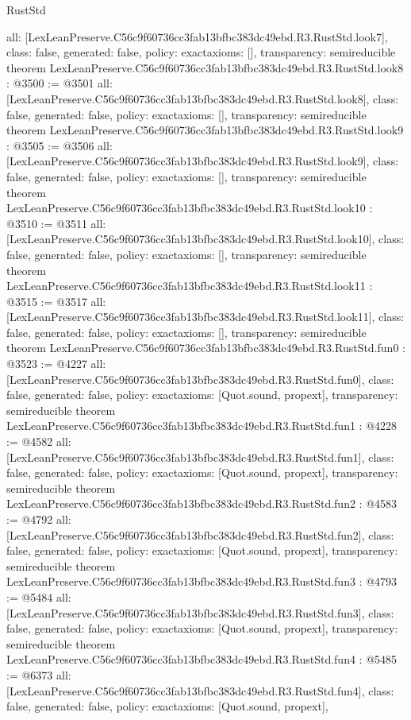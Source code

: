 \begin{lexlean}{RustStd}
\begin{coremodule}
{  all: [LexLeanPreserve.C56c9f60736cc3fab13bfbc383dc49ebd.R3.RustStd.look7],
  class: false,
  generated: false,
  policy: exact{axioms: []},
  transparency: semireducible
}
theorem LexLeanPreserve.C56c9f60736cc3fab13bfbc383dc49ebd.R3.RustStd.look8 : @3500 := @3501 {
  all: [LexLeanPreserve.C56c9f60736cc3fab13bfbc383dc49ebd.R3.RustStd.look8],
  class: false,
  generated: false,
  policy: exact{axioms: []},
  transparency: semireducible
}
theorem LexLeanPreserve.C56c9f60736cc3fab13bfbc383dc49ebd.R3.RustStd.look9 : @3505 := @3506 {
  all: [LexLeanPreserve.C56c9f60736cc3fab13bfbc383dc49ebd.R3.RustStd.look9],
  class: false,
  generated: false,
  policy: exact{axioms: []},
  transparency: semireducible
}
theorem LexLeanPreserve.C56c9f60736cc3fab13bfbc383dc49ebd.R3.RustStd.look10 : @3510 := @3511 {
  all: [LexLeanPreserve.C56c9f60736cc3fab13bfbc383dc49ebd.R3.RustStd.look10],
  class: false,
  generated: false,
  policy: exact{axioms: []},
  transparency: semireducible
}
theorem LexLeanPreserve.C56c9f60736cc3fab13bfbc383dc49ebd.R3.RustStd.look11 : @3515 := @3517 {
  all: [LexLeanPreserve.C56c9f60736cc3fab13bfbc383dc49ebd.R3.RustStd.look11],
  class: false,
  generated: false,
  policy: exact{axioms: []},
  transparency: semireducible
}
theorem LexLeanPreserve.C56c9f60736cc3fab13bfbc383dc49ebd.R3.RustStd.fun0 : @3523 := @4227 {
  all: [LexLeanPreserve.C56c9f60736cc3fab13bfbc383dc49ebd.R3.RustStd.fun0],
  class: false,
  generated: false,
  policy: exact{axioms: [Quot.sound, propext]},
  transparency: semireducible
}
theorem LexLeanPreserve.C56c9f60736cc3fab13bfbc383dc49ebd.R3.RustStd.fun1 : @4228 := @4582 {
  all: [LexLeanPreserve.C56c9f60736cc3fab13bfbc383dc49ebd.R3.RustStd.fun1],
  class: false,
  generated: false,
  policy: exact{axioms: [Quot.sound, propext]},
  transparency: semireducible
}
theorem LexLeanPreserve.C56c9f60736cc3fab13bfbc383dc49ebd.R3.RustStd.fun2 : @4583 := @4792 {
  all: [LexLeanPreserve.C56c9f60736cc3fab13bfbc383dc49ebd.R3.RustStd.fun2],
  class: false,
  generated: false,
  policy: exact{axioms: [Quot.sound, propext]},
  transparency: semireducible
}
theorem LexLeanPreserve.C56c9f60736cc3fab13bfbc383dc49ebd.R3.RustStd.fun3 : @4793 := @5484 {
  all: [LexLeanPreserve.C56c9f60736cc3fab13bfbc383dc49ebd.R3.RustStd.fun3],
  class: false,
  generated: false,
  policy: exact{axioms: [Quot.sound, propext]},
  transparency: semireducible
}
theorem LexLeanPreserve.C56c9f60736cc3fab13bfbc383dc49ebd.R3.RustStd.fun4 : @5485 := @6373 {
  all: [LexLeanPreserve.C56c9f60736cc3fab13bfbc383dc49ebd.R3.RustStd.fun4],
  class: false,
  generated: false,
  policy: exact{axioms: [Quot.sound, propext]},
}
\end{coremodule}
\end{lexlean}
